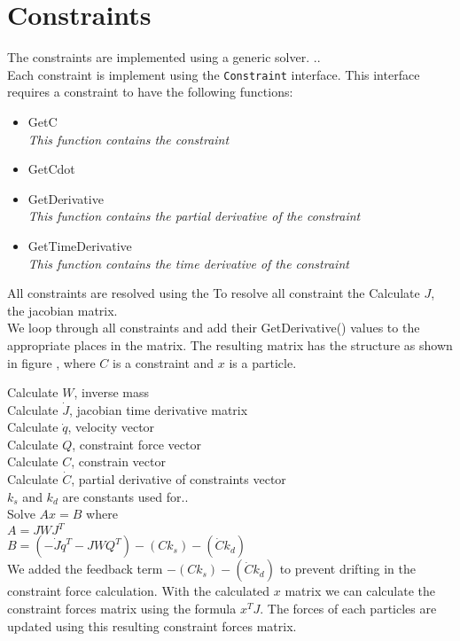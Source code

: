 \section{Constraints}

The constraints are implemented using a generic solver.
..
\\

Each constraint is implement using the \verb"Constraint" interface.
This interface requires a constraint to have the following functions:
\begin{itemize}
  \item GetC\\
  \emph{ This function contains the constraint }
  \item GetCdot\\
  \item GetDerivative\\
  \emph{ This function contains the partial derivative of the constraint  }
  \item GetTimeDerivative\\
  \emph{ This function contains the time derivative of the constraint }
\end{itemize}

All constraints are resolved using the
To resolve all constraint the
\noindent Calculate $J$, the jacobian matrix.\\
We loop through all constraints and add their GetDerivative() values to the appropriate places in the matrix.
The resulting matrix has the structure as shown in figure , where $C$ is a constraint and $x$ is a particle.

Calculate $W$, inverse mass \\
Calculate $\dot{J}$, jacobian time derivative matrix\\
Calculate $\dot{q}$, velocity vector\\
Calculate $Q$, constraint force vector\\
Calculate $C$, constrain vector\\
Calculate $\dot{C}$, partial derivative of constraints vector\\
$k_s$ and $k_d$ are constants used for..\\
Solve $Ax = B$ where\\
\;\;  $A = J W J^{T}$\\
\;\;  $B = (-\dot{J} \dot{q}^{T} - J W Q^{T}) - (C k_s) - (\dot{C} k_d)$\\
We added the feedback term $- (C k_s) - (\dot{C} k_d)$ to prevent drifting in the constraint force calculation.
With the calculated $x$ matrix we can calculate the constraint forces matrix using the formula $x^{T} J$.
The forces of each particles are updated using this resulting constraint forces matrix.\\

